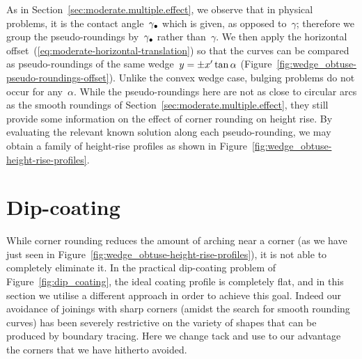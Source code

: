 As in Section~\ref{sec:moderate.multiple.effect},
we observe that in physical problems,
it is the contact angle~$\gamma_\bullet$ which is given,
as opposed to~$\gamma$;
therefore we group the pseudo-roundings by~$\gamma_\bullet$
rather than~$\gamma$.
We then apply the horizontal offset~(\ref{eq:moderate-horizontal-translation})
so that the curves can be compared as pseudo-roundings
of the same wedge~$y = \pm x' \tan\alpha$
(Figure~\ref{fig:wedge_obtuse-pseudo-roundings-offset}).
Unlike the convex wedge case,
bulging problems do not occur for any~$\alpha$.
While the pseudo-roundings here are not as close to circular arcs
as the smooth roundings of Section~\ref{sec:moderate.multiple.effect},
they still provide some information
on the effect of corner rounding on height rise.
By evaluating the relevant known solution
along each pseudo-rounding,
we may obtain a family of height-rise profiles
as shown in Figure~\ref{fig:wedge_obtuse-height-rise-profiles}.

\begin{figure}
\end{figure}

\begin{figure}
\end{figure}

\section{Dip-coating}
\label{sec:re-entrant.dip-coating}

While corner rounding reduces the amount of arching near a corner
(as we have just seen in Figure~\ref{fig:wedge_obtuse-height-rise-profiles}),
it is not able to completely eliminate it.
In the practical dip-coating problem of
Figure~\ref{fig:dip_coating},
the ideal coating profile is completely flat,
and in this section we utilise a different approach
in order to achieve this goal.
Indeed our avoidance of joinings with sharp corners
(amidst the search for smooth rounding curves)
has been severely restrictive
on the variety of shapes that can be produced by boundary tracing.
Here we change tack and use to our advantage
the corners that we have hitherto avoided.

